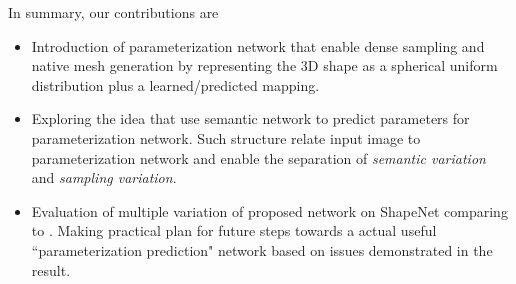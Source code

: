 In summary, our contributions are
\begin{itemize}
	\item  Introduction of parameterization network that enable dense sampling and native mesh generation by representing the 3D shape as a spherical uniform distribution plus a learned/predicted mapping.
	\item  Exploring the idea that use semantic network to predict parameters for parameterization network. Such structure  relate input image to parameterization network and enable the separation of \textit{semantic variation} and \textit{sampling variation}.
	\item Evaluation of multiple variation of proposed network on ShapeNet\cite{shapenetdata} comparing to \cite{PSGN}. Making practical plan for future steps towards a actual useful ``parameterization prediction" network based on issues demonstrated in the result.
\end{itemize}          

